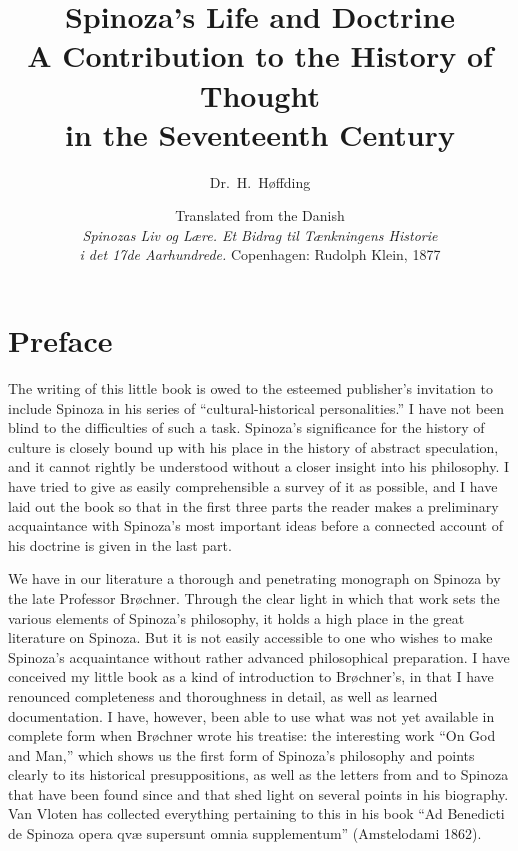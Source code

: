 \documentclass[12pt]{book}
\title{Spinoza's Life and Doctrine\\[0.4em]
  \large A Contribution to the History of Thought\\ in the Seventeenth Century}
\author{Dr.\ H.\ Høffding}
\date{Translated from the Danish\\[0.6em]
  \small \textit{Spinozas Liv og Lære. Et Bidrag til Tænkningens Historie\\
  i det 17de Aarhundrede.} Copenhagen: Rudolph Klein, 1877}
\newcommand{\opage}[1]{\marginnote{\footnotesize\textit{[#1]}}}
\begin{document}
\frontmatter
\maketitle

\chapter*{Preface}
\opage{III}The writing of this little book is owed to the esteemed publisher's
invitation to include Spinoza in his series of ``cultural-historical
personalities.'' I have not been blind to the difficulties of such a task.
Spinoza's significance for the history of culture is closely bound up with his
place in the history of abstract speculation, and it cannot rightly be understood
without a closer insight into his philosophy. I have tried to give as easily
comprehensible a survey of it as possible, and I have laid out the book so that in
the first three parts the reader makes a preliminary acquaintance with Spinoza's
most important ideas before a connected account of his doctrine is given in the
last part.

We have in our literature a thorough and penetrating monograph on Spinoza by the
late Professor Brøchner. Through the clear light in which that work sets the
various elements of Spinoza's philosophy, it holds a high place in the great
literature on Spinoza. But it is not easily accessible to one who wishes to make
Spinoza's acquaintance without rather advanced philosophical preparation. I have
conceived my little book as a kind of \opage{IV}introduction to Brøchner's, in that I
have renounced completeness and thoroughness in detail, as well as learned
documentation. I have, however, been able to use what was not yet available in
complete form when Brøchner wrote his treatise: the interesting work ``On God and
Man,'' which shows us the first form of Spinoza's philosophy and points clearly to
its historical presuppositions, as well as the letters from and to Spinoza that
have been found since and that shed light on several points in his biography. Van
Vloten has collected everything pertaining to this in his book ``Ad Benedicti de
Spinoza opera qvæ supersunt omnia supplementum'' (Amstelodami 1862).
\end{document}
